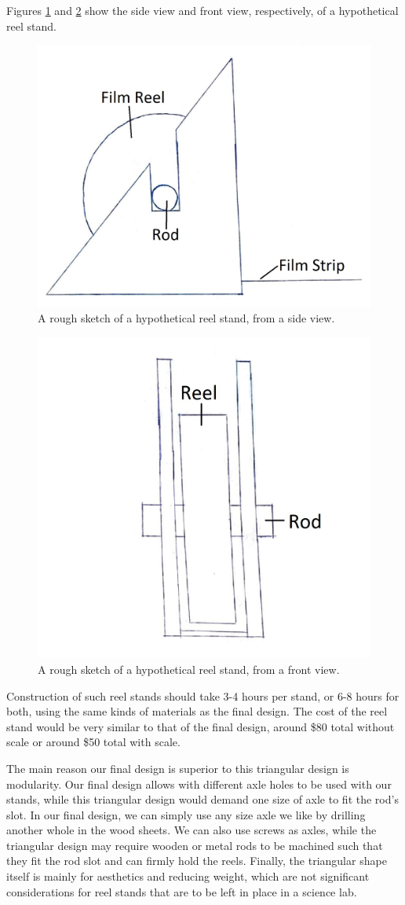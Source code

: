 \documentclass[12pt]{article} %
\begin{document}
Figures \ref{fig: reel stand side view} and \ref{fig: reel stand front view} show the side view and front view, respectively, of a hypothetical reel stand.
\begin{figure}[htb]
    \centering
    \includegraphics[width=0.5\linewidth]{Images/side view.jpg}
    \caption{A rough sketch of a hypothetical reel stand, from a side view.}
    \label{fig: reel stand side view}
\end{figure}
\begin{figure}[htb]
    \centering
    \includegraphics[width=0.5\linewidth]{Images/front view reel stand.jpg}
    \caption{A rough sketch of a hypothetical reel stand, from a front view.}
    \label{fig: reel stand front view}
\end{figure}

Construction of such reel stands should take 3-4 hours per stand, or 6-8 hours for both, using the same kinds of materials as the final design. The cost of the reel stand would be very similar to that of the final design, around \$80 total without scale or around \$50 total with scale.

The main reason our final design is superior to this triangular design is modularity. Our final design allows with different axle holes to be used with our stands, while this triangular design would demand one size of axle to fit the rod's slot. In our final design, we can simply use any size axle we like by drilling another whole in the wood sheets. We can also use screws as axles, while the triangular design may require wooden or metal rods to be machined such that they fit the rod slot and can firmly hold the reels. Finally, the triangular shape itself is mainly for aesthetics and reducing weight, which are not significant considerations for reel stands that are to be left in place in a science lab.
\end{document}
